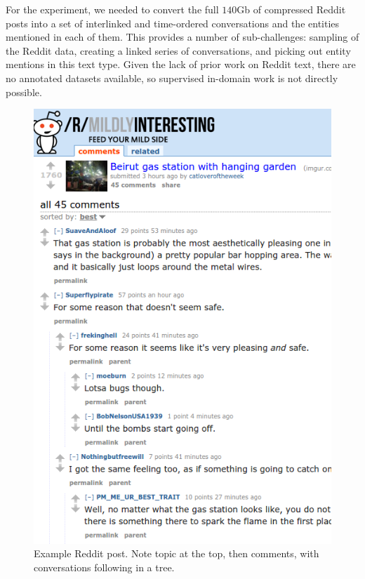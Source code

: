 \documentclass[sigconf,anonymous,review]{acmart}
\begin{document}
For the experiment, we needed to convert the full $140$Gb of compressed Reddit posts into a set of interlinked and time-ordered conversations and the entities mentioned in each of them.
This provides a number of sub-challenges: sampling of the Reddit data, creating a linked series of conversations, and picking out entity mentions in this text type.
Given the lack of prior work on Reddit text, there are no annotated datasets available, so supervised in-domain work is not directly possible.

\begin{figure}
\centering
\includegraphics[width=0.7\columnwidth]{reddit-example.png}
\caption{Example Reddit post. Note topic at the top, then comments, with conversations following in a tree.}
\label{fig:reddit-example}
\end{figure}
\end{document}
